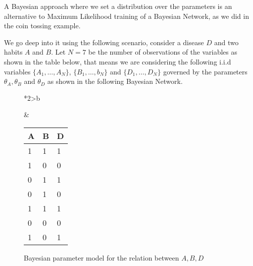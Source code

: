 A Bayesian approach where we set a distribution over the parameters is an
alternative to Maximum Likelihood training of a Bayesian Network, as we did in
the coin tossing example.

We go deep into it using the following scenario, consider a disease
\(D\) and two habits \(A\) and \(B\). Let \(N = 7\) be the number of observations of the variables as shown in the table below, that means we are considering the following i.i.d variables \(\{A_{1},\dots, A_{N}\}\), \(\{B_{1},\dots,b_{N}\}\) and \(\{D_{1},\dots, D_{N}\}\) governed by the parameters \(\theta_{A}, \theta_{B}\) and \(\theta_{D}\) as shown in the following Bayesian Network.

\begin{figure}[!ht]
  \begin{tabular}{*{2}{>{\centering\arraybackslash}b{}}}
  \centering
  \begin{tikzpicture}[
    node distance=1cm and 0.5cm,
    mynode/.style={draw,circle,text width=0.5cm,align=center}
    ]

    \node[mynode] (d) {\(D_{n}\)};
    \node[mynode, above left=of d] (a) {\(A_{n}\)};
    \node[mynode, above right=of d] (b) {\(B_{n}\)};
    \node[mynode, above=of a] (ta) {\(\theta_{A}\)};
    \node[mynode, above=of b] (tb) {\(\theta_{B}\)};
    \node[mynode, below=of d] (td) {\(\theta_{D}\)};
    \plate{} {(d)(a)(b)} {\(1\dots N\)}; %
    \path (a) edge[-latex] (d)
    (b) edge[-latex] (d)
    (ta) edge[-latex] (a)
    (tb) edge[-latex] (b)
    (td) edge[-latex] (d)
    ;

  \end{tikzpicture}
    \caption{Bayesian parameter model for the relation between \(A,B,D\)}
    \label{fig:bayesian_example}
    &
      \renewcommand{\arraystretch}{1.3}
      \begin{tabular}{|l|l|l|}
    \hline
    A & B & D \\ \hline
    1 & 1 & 1 \\ \hline
    1 & 0 & 0 \\ \hline
    0 & 1 & 1 \\ \hline
    0 & 1 & 0 \\ \hline
    1 & 1 & 1 \\ \hline
    0 & 0 & 0 \\ \hline
    1 & 0 & 1 \\ \hline
  \end{tabular}
\end{tabular}
\end{figure}

